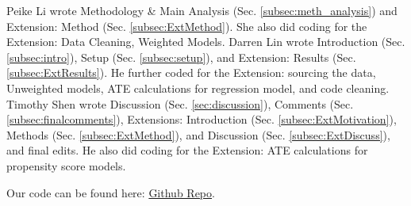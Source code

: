 \documentclass[12pt]{article}
\begin{document}
Peike Li wrote Methodology \& Main Analysis (Sec. \ref{subsec:meth_analysis}) and Extension: Method (Sec. \ref{subsec:ExtMethod}). She also did coding for the Extension: Data Cleaning, Weighted Models. Darren Lin wrote Introduction (Sec. \ref{subsec:intro}), Setup (Sec. \ref{subsec:setup}), and Extension: Results (Sec. \ref{subsec:ExtResults}). He further coded for the Extension: sourcing the data, Unweighted models, ATE calculations for regression model, and code cleaning. Timothy Shen wrote Discussion (Sec. \ref{sec:discussion}), Comments (Sec. \ref{subsec:finalcomments}), Extensions: Introduction (Sec. \ref{subsec:ExtMotivation}), Methods (Sec. \ref{subsec:ExtMethod}), and Discussion (Sec. \ref{subsec:ExtDiscuss}), and final edits.  He also did coding for the Extension: ATE calculations for propensity score models. 

Our code can be found here: \href{https://github.com/darrenlingit/biostat-m235-final-project}{Github Repo}.

\newpage


\end{document}
